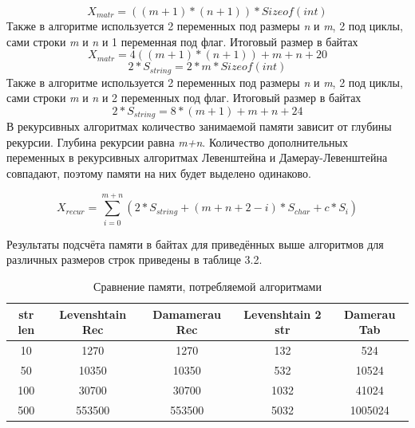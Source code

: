 \documentclass[12pt]{report}
\begin{document}
\begin{equation}X_{matr} = ((m+1)*(n+1))*Sizeof(int) 
\end{equation}
\newline
\newline
Также в алгоритме используется 2 переменных под размеры \textit{n} и \textit{m}, 2 под циклы, сами строки \textit{m} и \textit{n} и 1 переменная под флаг.
\newline
Итоговый размер в байтах \begin{equation}X_{matr} = 4((m+1)*(n+1)) + m + n + 20 
\end{equation}
\newline
\newline
\begin{equation}
2*S_{string} = 2*m*Sizeof(int)  
\end{equation}
\newline
\newline
Также в алгоритме используется 2 переменных под размеры \textit{n} и \textit{m}, 2 под циклы, сами строки \textit{m} и \textit{n} и 2 переменных под флаг.
\newline
Итоговый размер в байтах \begin{equation}2*S_{string} = 8*(m+1) + m + n + 24 
\end{equation}
\newline
\newline
В рекурсивных алгоритмах количество занимаемой памяти зависит от глубины рекурсии. Глубина рекурсии равна \textit{m+n}. Количество дополнительных переменных в рекурсивных алгоритмах Левенштейна и Дамерау-Левенштейна совпадают, поэтому памяти на них будет выделено одинаково.

\begin{equation}X_{recur} = \sum_{i=0}^{m+n} (2*S_{string}+(m+n+2-i)*S_{char}+c*S_i) \end{equation}

Результаты подсчёта памяти в байтах для приведённых выше алгоритмов для различных размеров строк приведены в таблице 3.2.
\newline
\begin{table}[h!]
	\begin{tabular}{|c|c|c|c|c|} 
 	\hline
	str len & Levenshtain Rec & Damamerau Rec & Levenshtain 2 str & Damerau Tab \\ [0.5ex] 
 	\hline\hline
 	10 & 1270 & 1270 & 132 & 524\\
 	\hline
 	50 & 10350 & 10350 & 532 & 10524\\
 	\hline
	100 & 30700 & 30700 & 1032 & 41024\\
	\hline
	500 & 553500 & 553500 & 5032 & 1005024\\
	\hline
	\end{tabular}
\caption{Сравнение памяти, потребляемой алгоритмами}
\end{table}
\end{document}
